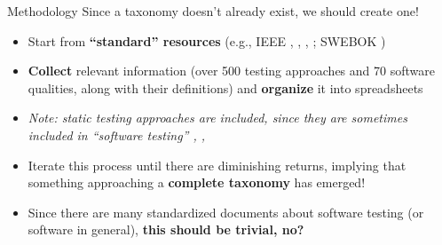 \documentclass[22pt]{beamer}
\begin{document}
\begin{frame}[fragile]
\begin{textblock}{7.25}
        \begin{block}{\fontsize{37}{20}\selectfont Methodology}
            Since a taxonomy doesn't already exist, we should create one!
            \begin{itemize}
                \item Start from \textbf{``standard'' resources}
                      (e.g., IEEE \cite{IEEE2022}, \cite{IEEE2021},
                      \cite{IEEE2017}, \cite{IEEE2013}; SWEBOK \cite{SWEBOK2024})
                \item \textbf{Collect} relevant information (over 500 testing
                      approaches and 70 software qualities, along with their
                      definitions) and \textbf{organize} it into spreadsheets
                \item \emph{Note: static testing approaches are included, since
                          they are sometimes included in ``software testing''
                          \cite[p.~17]{IEEE2022}, \cite[p.~440]{IEEE2017},
                          \cite[p.~5-2]{SWEBOK2024}}
                \item Iterate this process until there are
                      diminishing returns, implying that something approaching
                      a \textbf{complete taxonomy} has emerged!
                \item Since there are many standardized documents about
                      software testing (or software in general),
                      \textbf{this should be trivial, no?}
            \end{itemize}
            \vspace{5mm}
        \end{block}


\end{textblock}
\end{frame}
\end{document}
